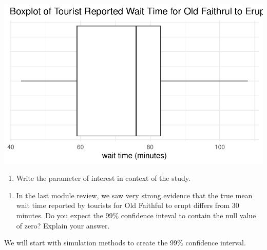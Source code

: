 \documentclass[
]{report}
\newenvironment{Shaded}{\begin{snugshade}}{\end{snugshade}}
\newcommand{\AttributeTok}[1]{\textcolor[rgb]{0.13,0.29,0.53}{#1}}
\newcommand{\CommentTok}[1]{\textcolor[rgb]{0.56,0.35,0.01}{\textit{#1}}}
\newcommand{\DecValTok}[1]{\textcolor[rgb]{0.00,0.00,0.81}{#1}}
\newcommand{\FloatTok}[1]{\textcolor[rgb]{0.00,0.00,0.81}{#1}}
\newcommand{\FunctionTok}[1]{\textcolor[rgb]{0.13,0.29,0.53}{\textbf{#1}}}
\newcommand{\NormalTok}[1]{#1}
\newcommand{\SpecialCharTok}[1]{\textcolor[rgb]{0.81,0.36,0.00}{\textbf{#1}}}
\newcommand{\StringTok}[1]{\textcolor[rgb]{0.31,0.60,0.02}{#1}}
\providecommand{\tightlist}{%
  \setlength{\itemsep}{0pt}\setlength{\parskip}{0pt}}
\begin{document}
\begin{center}\includegraphics[width=0.6\linewidth]{10-UR-module7_review_files/figure-latex/unnamed-chunk-2-1} \end{center}

\begin{enumerate}
\def\labelenumi{\arabic{enumi}.}
\tightlist
\item
  Write the parameter of interest in context of the study.
\end{enumerate}

\vspace{0.8in}

\begin{enumerate}
\def\labelenumi{\arabic{enumi}.}
\setcounter{enumi}{1}
\tightlist
\item
  In the last module review, we saw very strong evidence that the true mean wait time reported by tourists for Old Faithful to erupt differs from 30 minutes. Do you expect the 99\% confidence inteval to contain the null value of zero? Explain your answer.
\end{enumerate}

\vspace{1in}

We will start with simulation methods to create the 99\% confidence interval.

\begin{Shaded}
\end{Shaded}
\end{document}
